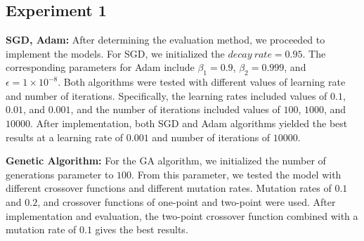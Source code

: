 \documentclass[../ICIT-Paper-2024.tex]{subfiles}
\begin{document}
\subsection{Experiment 1}
\textbf{SGD, Adam: }
After determining the evaluation method, we proceeded to implement the models. For SGD, we initialized the $decay\ rate = 0.95$. The corresponding parameters for Adam include $\beta_1 = 0.9$, $\beta_2 = 0.999$, and $\epsilon = 1\times10^{-8}$. Both algorithms were tested with different values of learning rate and number of iterations. Specifically, the learning rates included values of $0.1$, $0.01$, and $0.001$, and the number of iterations included values of $100$, $1000$, and $10000$. After implementation, both SGD and Adam algorithms yielded the best results at a learning rate of $0.001$ and number of iterations of $10000$.


\textbf{Genetic Algorithm: }
For the GA algorithm, we initialized the number of generations parameter to $100$. From this parameter, we tested the model with different crossover functions and different mutation rates. Mutation rates of $0.1$ and $0.2$, and crossover functions of one-point and two-point were used. After implementation and evaluation, the two-point crossover function combined with a mutation rate of $0.1$ gives the best results.
\end{document}
